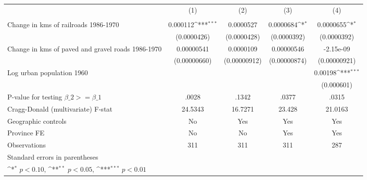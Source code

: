 {
\def\sym#1{\ifmmode^{#1}\else\(^{#1}\)\fi}
\begin{tabular}{l*{4}{c}}
\hline\hline
                &\multicolumn{1}{c}{(1)}&\multicolumn{1}{c}{(2)}&\multicolumn{1}{c}{(3)}&\multicolumn{1}{c}{(4)}\\
                &\multicolumn{1}{c}{}&\multicolumn{1}{c}{}&\multicolumn{1}{c}{}&\multicolumn{1}{c}{}\\
\hline
Change in kms of railroads 1986-1970& 0.000112\sym{***}&0.0000527         &0.0000684\sym{*}  &0.0000655\sym{*}  \\
                &(0.0000426)         &(0.0000428)         &(0.0000392)         &(0.0000392)         \\
[1em]
Change in kms of paved and gravel roads 1986-1970&0.00000541         &0.0000109         &0.00000546         &-2.15e-09         \\
                &(0.00000660)         &(0.00000912)         &(0.00000874)         &(0.00000921)         \\
[1em]
Log urban population 1960&                  &                  &                  &  0.00198\sym{***}\\
                &                  &                  &                  &(0.000601)         \\
\hline
P-value for testing $\beta\_{2} >= \beta\_{1}$&    .0028         &    .1342         &    .0377         &    .0315         \\
Cragg-Donald (multivariate) F-stat&  24.5343         &  16.7271         &   23.428         &  21.0163         \\
Geographic controls&       No         &      Yes         &      Yes         &      Yes         \\
Province FE     &       No         &       No         &      Yes         &      Yes         \\
Observations    &      311         &      311         &      311         &      287         \\
\hline\hline
\multicolumn{5}{l}{\footnotesize Standard errors in parentheses}\\
\multicolumn{5}{l}{\footnotesize \sym{*} \(p<0.10\), \sym{**} \(p<0.05\), \sym{***} \(p<0.01\)}\\
\end{tabular}
}
